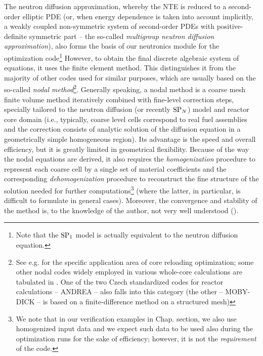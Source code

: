 The neutron diffusion approximation, whereby the NTE is reduced to a second-order elliptic PDE (or, when energy
dependence is taken into account implicitly, a weakly coupled non-symmetric system of second-order PDEs with
positive-definite symmetric part -- the so-called \textit{multigroup neutron diffusion approximation}), also forms the
basis of our neutronics module for the optimization code\footnote{Note that the $\SPN[1]$ model is actually equivalent
to the neutron diffusion equation.}
However, to obtain the final discrete algebraic system of equations, it uses the finite element method. 
This distinguishes it from the majority of other codes used for similar purposes, which are usually based on the so-called \textit{nodal method}\footnote{See e.g.
\cite{opt1,opt2,opt3} for the specific application area of core reloading optimization; some other nodal codes widely
employed in various whole-core calculations are tabulated in \cite{mox-bench}. One of the two Czech standardized codes
for reactor calculations -- ANDREA \cite{ANDREA} -- also falls into this category (the other -- MOBY-DICK
\cite{MOBYDICK} -- is based on a finite-difference method on a structured mesh)\label{ftn:nodal}}.
Generally speaking, a nodal method is a coarse mesh finite volume method iteratively combined with fine-level correction steps, specially tailored to the
neutron diffusion (or recently $\SPN$) model and reactor core domain (i.e., typically, coarse level cells
correspond to real fuel assemblies and the correction consists of analytic solution of the diffusion equation in a
geometrically simple homogeneous region). Its advantage is the speed and overall efficiency, but it is greatly limited
in geometrical flexibility. Because of the way the nodal equations are derived, it also requires the
\textit{homogenization} procedure to represent each coarse cell by a single set of material coefficients and the 
corresponding \textit{dehomogenization} procedure to reconstruct the fine structure of the solution needed for further 
computations\footnote{We note that in our verification examples in Chap. \alert{section}, we also use homogenized input 
data and we expect such data to be used also during the optimization runs for the sake of efficiency; however, it is not
the \textit{requirement} of the code.} (where the latter, in particular, is difficult to formulate in general cases).
Moreover, the convergence and stability of the method is, to the knowledge of the author, not very well understood 
(\cite{ZiminComm}).

